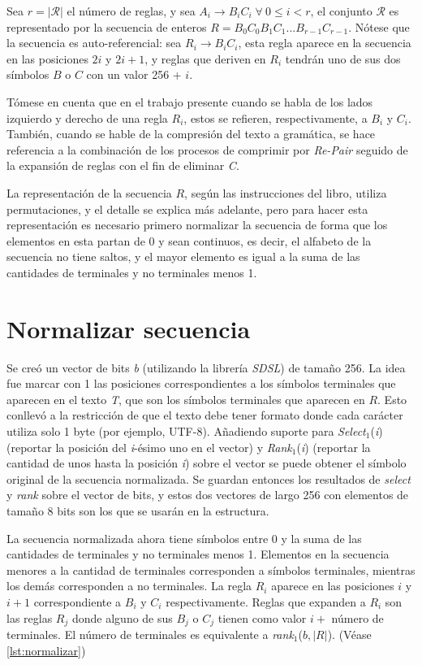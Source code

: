 Sea $r = |\mathcal{R}|$ el número de reglas, y sea $A_i \rightarrow B_i C_i\; \forall\ 0\leq i < r$, el conjunto $\mathcal{R}$ es representado por la secuencia de enteros $R =  B_0 C_0 B_1 C_1 ... B_{r-1}C_{r-1}$. Nótese que la secuencia es auto-referencial: sea $R_i \rightarrow B_i C_i$, esta regla aparece en la secuencia en las posiciones $2i$ y $2i+1$, y reglas que deriven en $R_i$ tendrán uno de sus dos símbolos $B$ o $C$ con un valor 256 + $i$. 

Tómese en cuenta que en el trabajo presente cuando se habla de los lados izquierdo y derecho de una regla $R_i$, estos se refieren, respectivamente, a $B_i$ y $C_i$. También, cuando se hable de la compresión del texto a gramática, se hace referencia a la combinación de los procesos de comprimir por \textit{Re-Pair} seguido de la expansión de reglas con el fin de eliminar \textit{C}. 

La representación de la secuencia $R$, según las instrucciones del libro, utiliza permutaciones, y el detalle se explica más adelante, pero para hacer esta representación es necesario primero normalizar la secuencia de forma que los elementos en esta partan de 0 y sean continuos, es decir, el alfabeto de la secuencia no tiene saltos, y el mayor elemento es igual a la suma de las cantidades de terminales y no terminales menos 1.

\section{Normalizar secuencia}

Se creó un vector de bits \textit{b} (utilizando la librería \textit{SDSL}\cite{sdsl-lite}) de tamaño 256. La idea fue marcar con 1 las posiciones correspondientes a los símbolos terminales que aparecen en el texto \textit{T}, que son los símbolos terminales que aparecen en $R$. Esto conllevó a la restricción de que el texto debe tener formato donde cada carácter utiliza solo 1 byte (por ejemplo, UTF-8). Añadiendo suporte para \textit{Select}$_1$(\textit{i}) (reportar la posición del \textit{i}-ésimo uno en el vector) y \textit{Rank}$_1$(\textit{i}) (reportar la cantidad de unos hasta la posición \textit{i}) sobre el vector se puede obtener el símbolo original de la secuencia normalizada. Se guardan entonces los resultados de \textit{select} y \textit{rank} sobre el vector de bits, y estos dos vectores de largo 256 con elementos de tamaño 8 bits son los que se usarán en la estructura.

La secuencia normalizada ahora tiene símbolos entre 0 y la suma de las cantidades de terminales y no terminales menos 1. Elementos en la secuencia menores a la cantidad de terminales corresponden a símbolos terminales, mientras los demás corresponden a no terminales. La regla $R_i$ aparece en las posiciones $i$ y $i+1$ correspondiente a $B_i$ y $C_i$ respectivamente. Reglas que expanden a $R_i$ son las reglas $R_j$ donde alguno de sus $B_j$ o $C_j$ tienen como valor $i + $ número de terminales. El número de terminales es equivalente a \textit{rank}$_1$($b, |R|$). (Véase \ref{lst:normalizar})

